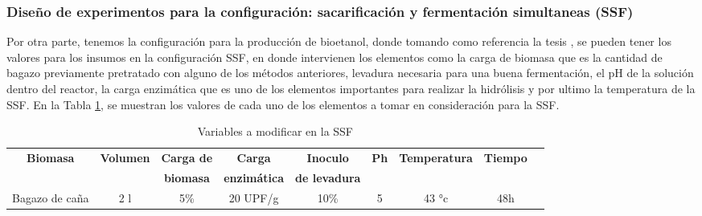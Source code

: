 \documentclass[12pt]{article}
\begin{document}


	
		\subsubsection{Diseño de experimentos para la configuración:
			sacarificación y fermentación simultaneas (SSF)}
		\label{SacariSF}	
		
		
		Por otra parte, tenemos la configuración para la producción de bioetanol, donde tomando como referencia la tesis \cite{Arturo2022evaluacion}, se pueden tener los valores para los insumos en la configuración SSF, en donde intervienen los elementos como la carga de biomasa que es la cantidad de bagazo previamente pretratado con alguno de los métodos anteriores, levadura necesaria para una buena fermentación, el pH de la solución dentro del reactor, la carga enzimática que es uno de los elementos importantes para realizar la hidrólisis y por ultimo la temperatura de la SSF. En la Tabla 	\ref{tab:Variables a modificar para la hidrolisis y fermentacion}, se muestran los valores de cada uno de los elementos a tomar en consideración para la SSF. \\[0.5em]
		
		\begin{table} [h!]
			\centering
			\caption{Variables a modificar en la SSF}
			\label{tab:Variables a modificar para la hidrolisis y fermentacion}
			\small
			\resizebox{17cm}{!} {
			\begin{tabular}{|c|c|c|c|c|c|c|c|c|}
				\hline
			\textbf{Biomasa}  &\textbf{ Volumen}  & \textbf{Carga de } & \textbf{Carga}  & \textbf{Inoculo}  &\textbf{ Ph}  & \textbf{Temperatura } & \textbf{Tiempo}   \\
				 &   & \textbf{ biomasa}  & \textbf{enzimática } & \textbf{de levadura } & &  &     \\
				
				\hline
			\multirow{2}{*}{Bagazo de caña} &\multirow{2}{*}{2 l}  &\multirow{2}{*}{5\%}  & \multirow{2}{*}{20 UPF/g } & \multirow{2}{*}{10\% } &\multirow{2}{*}{ 5} & \multirow{2}{*}{43 °c} & \multirow{2}{*}{48h }   \\
			  &   & & &  &  & &     \\		
				\hline
			\end{tabular}}
		\end{table}
		
\end{document}
